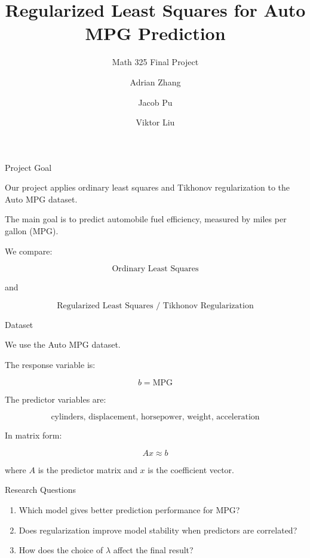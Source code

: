 \documentclass[aspectratio=169]{beamer}
\title{Regularized Least Squares for Auto MPG Prediction}
\subtitle{Math 325 Final Project}
\author{Adrian Zhang \and Jacob Pu \and Viktor Liu}
\date{}
\begin{document}
\begin{frame}
    \titlepage
\end{frame}

\begin{frame}{Project Goal}

Our project applies ordinary least squares and Tikhonov regularization to the Auto MPG dataset.

\medskip

The main goal is to predict automobile fuel efficiency, measured by miles per gallon (MPG).

\medskip

We compare:

\[
\text{Ordinary Least Squares}
\]

and

\[
\text{Regularized Least Squares / Tikhonov Regularization}
\]

\end{frame}

\begin{frame}{Dataset}

We use the Auto MPG dataset.

\medskip

The response variable is:

\[
b = \text{MPG}
\]

The predictor variables are:

\[
\text{cylinders, displacement, horsepower, weight, acceleration}
\]

\medskip

In matrix form:

\[
A x \approx b
\]

where \(A\) is the predictor matrix and \(x\) is the coefficient vector.

\end{frame}

\begin{frame}{Research Questions}

\begin{enumerate}
    \item Which model gives better prediction performance for MPG?
    \item Does regularization improve model stability when predictors are correlated?
    \item How does the choice of \(\lambda\) affect the final result?
\end{enumerate}

\end{frame}
\end{document}
